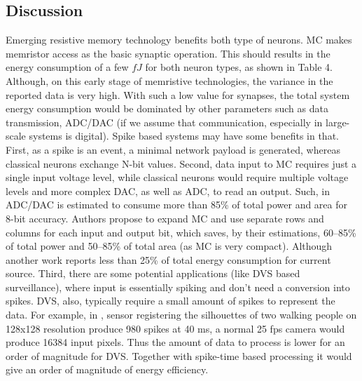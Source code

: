 \documentclass[conference, compsoc]{IEEEtran}
\begin{document}
\subsection{Discussion}
Emerging resistive memory technology benefits both type of neurons. MC makes memristor access as the basic synaptic operation. This should results in the energy consumption of a few $ fJ $ for both neuron types, as shown in Table 4. Although, on this early stage of memristive technologies, the variance in the reported data is very high. With such a low value for synapses, the total system energy consumption would be dominated by other parameters such as data transmission, ADC/DAC (if we assume that communication, especially in large-scale systems is digital). Spike based systems may have some benefits in that. First, as a spike is an event, a minimal network payload is generated, whereas classical neurons exchange N-bit values. Second, data input to MC requires just a single input voltage level, while classical neurons would require multiple voltage levels and more complex DAC, as well as ADC, to read an output. Such, in \cite{Merging_Interface} ADC/DAC is estimated to consume more than 85\% of total power and area for 8-bit accuracy. Authors propose to expand MC and use separate rows and columns for each input and output bit, which saves, by their estimations, 60--85\% of total power and 50--85\% of total area (as MC is very compact). Although another work \cite{STT_SNN} reports less than 25\% of total energy consumption for current source. Third, there are some potential applications (like DVS based surveillance), where input is essentially spiking and don’t need a conversion into spikes. DVS, also, typically require a small amount of spikes to represent the data. For example, in \cite{DVS_analog}, sensor registering the silhouettes of two walking people on 128x128 resolution produce 980 spikes at 40 ms, a normal 25 fps camera would produce 16384 input pixels. Thus the amount of data to process is lower for an order of magnitude for DVS. Together with spike-time based processing it would give an order of magnitude of energy efficiency.
\end{document}
